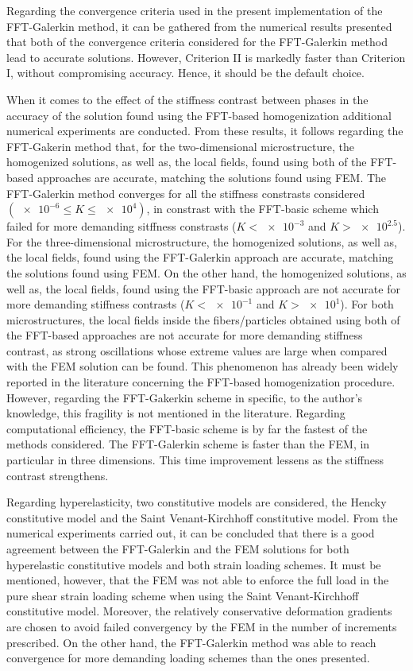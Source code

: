 Regarding the convergence criteria used in the present implementation of the FFT-Galerkin method, it can be gathered from the numerical results presented that both of the convergence criteria considered for the FFT-Galerkin method lead to accurate solutions.
However, Criterion II is markedly faster than Criterion I, without compromising accuracy.
Hence, it should be the default choice.

When it comes to the effect of the stiffness contrast between phases in the accuracy of the solution found using the FFT-based homogenization additional numerical experiments are conducted.
From these results, it follows regarding the FFT-Gakerin method that,
for the two-dimensional microstructure, the homogenized solutions, as well as, the local fields, found using both of the FFT-based approaches are accurate, matching the solutions found using FEM.
The FFT-Galerkin method converges for all the stiffness constrasts considered \((\num{e-6} \leq K \leq \num{e4})\), in constrast with the FFT-basic scheme which failed for more demanding sitffness constrasts (\(K<\num{e-3}\) and \(K>\num{e2.5}\)).
For the three-dimensional microstructure, the homogenized solutions, as well as, the local fields, found using the FFT-Galerkin approach are accurate, matching the solutions found using FEM.
On the other hand, the homogenized solutions, as well as, the local fields, found using the FFT-basic approach are not accurate for more demanding stiffness contrasts (\(K<\num{e-1}\) and \(K>\num{e1}\)).
For both microstructures, the local fields inside the fibers/particles obtained using both of the FFT-based approaches are not accurate for more demanding stiffness contrast, as strong oscillations whose extreme values are large when compared with the FEM solution can be found.
This phenomenon has already been widely reported in the literature concerning the FFT-based homogenization procedure.
However, regarding the FFT-Gakerkin scheme in specific, to the author's knowledge, this fragility is not mentioned in the literature.
Regarding computational efficiency, the FFT-basic scheme is by far the fastest of the methods considered.
The FFT-Galerkin scheme is faster than the FEM, in particular in three dimensions.
This time improvement lessens as the stiffness contrast strengthens.

Regarding hyperelasticity, two constitutive models are considered, the Hencky constitutive model and the Saint Venant-Kirchhoff constitutive model.
From the numerical experiments carried out, it can be concluded that there is a good agreement between the FFT-Galerkin and the FEM solutions for both hyperelastic constitutive models and both strain loading schemes.
It must be mentioned, however, that the FEM was not able to enforce the full load in the pure shear strain loading scheme when using the Saint Venant-Kirchhoff constitutive model.
Moreover, the relatively conservative deformation gradients are chosen to avoid failed convergency by the FEM in the number of increments prescribed.
On the other hand, the FFT-Galerkin method was able to reach convergence for more demanding loading schemes than the ones presented.

